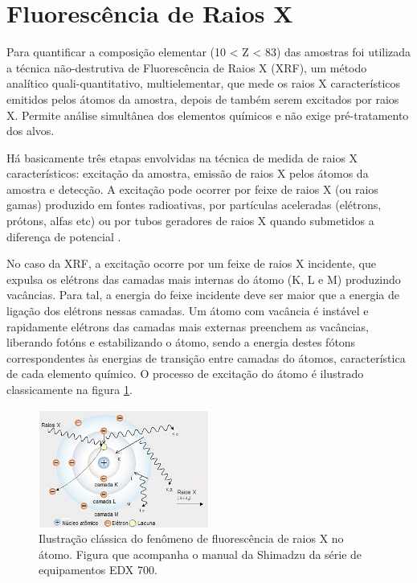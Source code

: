 \newpage
\section{Fluorescência de Raios X}

Para quantificar a composição elementar (10 < Z < 83) das 
amostras foi utilizada a técnica não-destrutiva de Fluorescência de Raios X 
(XRF), um método analítico quali-quantitativo, multielementar, 
que mede os raios X característicos emitidos pelos átomos da amostra, 
depois de também serem excitados por raios X. Permite análise simultânea dos 
elementos químicos e não exige pré-tratamento dos alvos.

Há basicamente três etapas envolvidas na técnica de medida de raios X 
característicos: excitação da amostra, emissão de raios X pelos átomos da amostra
e detecção. A excitação pode ocorrer por feixe de raios X (ou raios gamas) 
produzido em fontes radioativas, por partículas aceleradas 
(elétrons, prótons, alfas etc) ou 
por tubos geradores de raios X quando submetidos a diferença de potencial
\citep{jenkins1988}.

No caso da XRF, a excitação ocorre por um feixe de raios X incidente, que  
expulsa os elétrons das camadas mais internas do átomo (K, L e M) 
produzindo vacâncias. Para tal, a energia do feixe incidente deve ser maior 
que a energia de ligação dos elétrons nessas camadas. Um átomo com vacância é 
instável e rapidamente elétrons das camadas mais externas preenchem as vacâncias,
liberando fotóns e estabilizando o átomo, sendo a energia destes fótons 
correspondentes às energias de transição entre camadas do átomos, 
característica de cada elemento químico. O processo de excitação do átomo 
é ilustrado classicamente na figura \ref{fig:shimadzu_atomo}.

\begin{figure}[H]
  \centering
  \includegraphics[width=0.5\textwidth]{../inputs/images/shimadzu_atomo.jpg}
  \caption{Ilustração clássica do fenômeno de fluorescência de raios X no átomo. 
           Figura que acompanha o manual da Shimadzu da série de equipamentos
           EDX 700. \label{fig:shimadzu_atomo}}
\end{figure}

